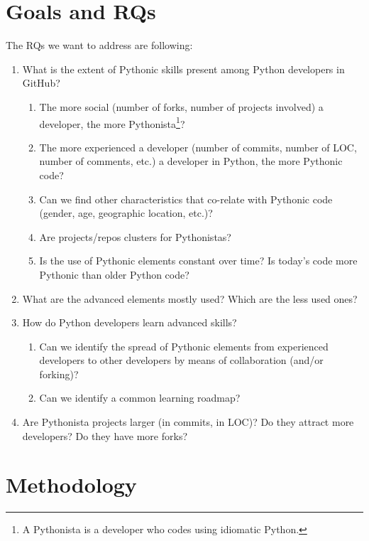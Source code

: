 \documentclass[conference]{IEEEtran}
\begin{document}
\section{Goals and RQs}

The RQs we want to address are following:

\begin{enumerate}
  \item
What is the extent of Pythonic skills present among Python developers in GitHub?
  \begin{enumerate}
    \item The more social (number of forks, number of projects involved) a developer,
 the more Pythonista\footnote{A Pythonista is a developer who codes using idiomatic Python.}?
    \item The more experienced a developer (number of commits, number of LOC, number of comments, etc.) a developer in Python, the more Pythonic code?
    \item Can we find other characteristics that co-relate with Pythonic code (gender, age, geographic location, etc.)?
    \item Are projects/repos clusters for Pythonistas?
    \item Is the use of Pythonic elements constant over time? Is today's code more Pythonic than older Python code?
  \end{enumerate}

  \item What are the advanced elements mostly used? Which are the less used ones?

  \item How do Python developers learn advanced skills?
  \begin{enumerate}
    \item Can we identify the spread of Pythonic elements from experienced developers to other developers by means of collaboration (and/or forking)?
    \item Can we identify a common learning roadmap?
  \end{enumerate}
  \item Are Pythonista projects larger (in commits, in LOC)? Do they attract more developers? Do they have more forks?
\end{enumerate}


\section{Methodology}
\end{document}
